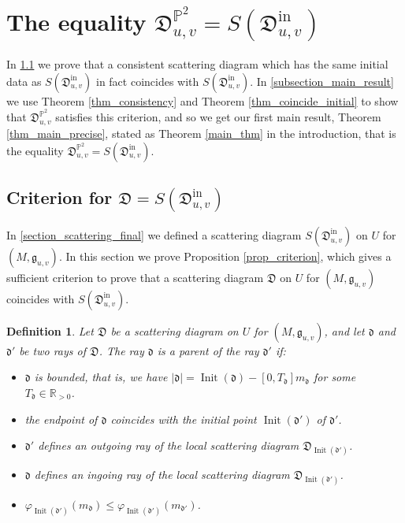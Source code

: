 \documentclass[12pt, a4paper]{amsart}
\newtheorem{defn}{Definition}[section]
\newcommand\PP{\mathbb P}
\newcommand\R{\mathbb R}
\newcommand\fd{\mathfrak d}
\newcommand\fD{\mathfrak D}
\newcommand\fg{\mathfrak g}
\newcommand\Init{\operatorname{Init}}
\newcommand\iin{\mathrm{in}}
\begin{document}
\section{The equality $\fD^{\PP^2}_{u,v}=S(\fD_{u,v}^\iin)$}
\label{section_main_result}

In \cref{section_criterion} we prove that a consistent scattering diagram which
has the same initial data as $S(\fD_{u,v}^\iin)$ in fact coincides with $S(\fD_{u,v}^\iin)$.
In 
\cref{subsection_main_result} we use 
Theorem \ref{thm_consistency} and Theorem
\ref{thm_coincide_initial} to show that 
$\fD^{\PP^2}_{u,v}$ satisfies this criterion, and so we get our first main result, Theorem \ref{thm_main_precise}, 
stated as Theorem \ref{main_thm} in the introduction, that is
the equality $\fD^{\PP^2}_{u,v}=S(\fD_{u,v}^\iin)$.

\subsection{Criterion for $\fD=S(\fD^\iin_{u,v})$}
\label{section_criterion}


In \cref{section_scattering_final} we defined a scattering diagram 
$S(\fD^\iin_{u,v})$ on $U$ for 
$(M,\fg_{u,v})$.
In this section we prove 
Proposition \ref{prop_criterion}, which gives a sufficient criterion to prove that a scattering diagram $\fD$ on $U$
for $(M,\fg_{u,v})$ coincides with $S(\fD^\iin_{u,v})$.

\begin{defn} \label{def_parent}
Let $\fD$ be a scattering diagram on 
$U$ for $(M,\fg_{u,v})$, and let $\fd$ and $\fd'$ be two rays of 
$\fD$. The ray $\fd$ is a \emph{parent} of
the ray $\fd'$ if:
\begin{itemize}
\item[(i)] $\fd$ is bounded, that is, we have 
$|\fd|=\Init(\fd)-[0,T_\fd]m_\fd$ for some 
$T_{\fd} \in \R_{>0}$.
\item[(ii)] the endpoint of $\fd$ coincides with the initial point $\Init(\fd')$ of 
$\fd'$.
\item[(iii)] $\fd'$ defines an outgoing ray of the local scattering diagram $\fD_{\Init(\fd')}$.
\item[(iv)] $\fd$ defines an ingoing ray of the 
local scattering diagram 
$\fD_{\Init(\fd')}$.
\item[(v)] $\varphi_{\Init(\fd')}(m_\fd) \leqslant \varphi_{\Init(\fd')}(m_{\fd'})$.
\end{itemize}
\end{defn}
\end{document}
